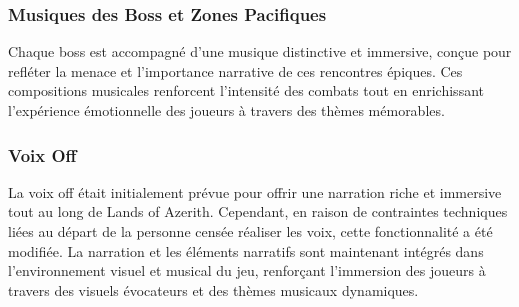 \subsubsection{Musiques des Boss et Zones Pacifiques}

Chaque boss est accompagné d'une musique distinctive et immersive, conçue pour refléter la menace et l'importance narrative de ces rencontres épiques.
Ces compositions musicales renforcent l'intensité des combats tout en enrichissant l'expérience émotionnelle des joueurs à travers des thèmes mémorables.


\subsubsection{Voix Off}

La voix off était initialement prévue pour offrir une narration riche et immersive tout au long de Lands of Azerith.
Cependant, en raison de contraintes techniques liées au départ de la personne censée réaliser les voix, cette fonctionnalité a été modifiée.
La narration et les éléments narratifs sont maintenant intégrés dans l'environnement visuel et musical du jeu, renforçant l'immersion des joueurs à travers des visuels évocateurs et des thèmes musicaux dynamiques.


